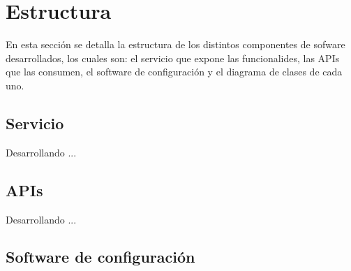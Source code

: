 \section{Estructura}
En esta sección se detalla la estructura de los distintos componentes de sofware desarrollados, los cuales son: el servicio que expone las funcionalides, las APIs que las consumen, el software de configuración  y el diagrama de clases de cada uno.

\subsection{Servicio}
Desarrollando ...
\subsection{APIs}
Desarrollando ...
\subsection{Software de configuración}